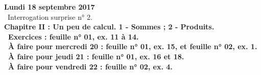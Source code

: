 \documentclass[12pt,a4paper]{article}
\begin{document}
% 
%  
% 
% 
% 

\noindent\textbf{\bf Lundi 18 septembre 2017}\\
\bu\ Interrogation surprise n° 2.\\
\bf Chapitre II \rm : Un peu de calcul. 1 - Sommes ; 2 - Produits.\\
\bu\ Exercices : feuille n° 01, ex. 11 à 14.\\
\bu\ À faire pour mercredi 20 : feuille n° 01, ex. 15, et feuille n° 02, ex. 1.\\
\bu\ À faire pour jeudi 21 : feuille n° 01, ex. 16 et 18.\\
\bu\ À faire pour vendredi 22 : feuille n° 02, ex. 4.\vspace{.4cm}\\
\end{document}
